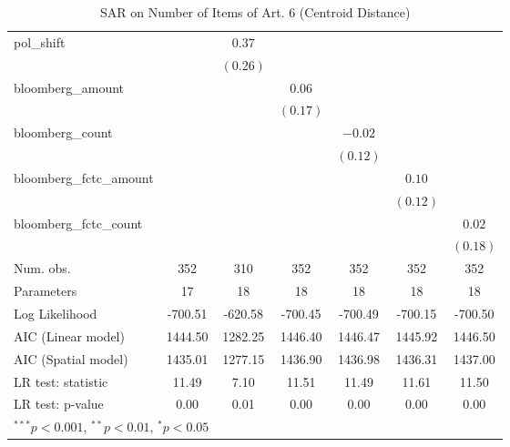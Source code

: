 \begin{table}[!h]
\begin{center}
\begin{tabular}{l c c c c c c }
pol\_shift              &              & $0.37$       &              &              &              &              \\
                        &              & $(0.26)$     &              &              &              &              \\
bloomberg\_amount       &              &              & $0.06$       &              &              &              \\
                        &              &              & $(0.17)$     &              &              &              \\
bloomberg\_count        &              &              &              & $-0.02$      &              &              \\
                        &              &              &              & $(0.12)$     &              &              \\
bloomberg\_fctc\_amount &              &              &              &              & $0.10$       &              \\
                        &              &              &              &              & $(0.12)$     &              \\
bloomberg\_fctc\_count  &              &              &              &              &              & $0.02$       \\
                        &              &              &              &              &              & $(0.18)$     \\
\midrule
Num. obs.               & 352          & 310          & 352          & 352          & 352          & 352          \\
Parameters              & 17           & 18           & 18           & 18           & 18           & 18           \\
Log Likelihood          & -700.51      & -620.58      & -700.45      & -700.49      & -700.15      & -700.50      \\
AIC (Linear model)      & 1444.50      & 1282.25      & 1446.40      & 1446.47      & 1445.92      & 1446.50      \\
AIC (Spatial model)     & 1435.01      & 1277.15      & 1436.90      & 1436.98      & 1436.31      & 1437.00      \\
LR test: statistic      & 11.49        & 7.10         & 11.51        & 11.49        & 11.61        & 11.50        \\
LR test: p-value        & 0.00         & 0.01         & 0.00         & 0.00         & 0.00         & 0.00         \\
\bottomrule
\multicolumn{7}{l}{\scriptsize{$^{***}p<0.001$, $^{**}p<0.01$, $^*p<0.05$}}
\end{tabular}
\caption{SAR on Number of Items of Art. 6 (Centroid Distance)}
\label{table:coefficients}
\end{center}
\end{table}
